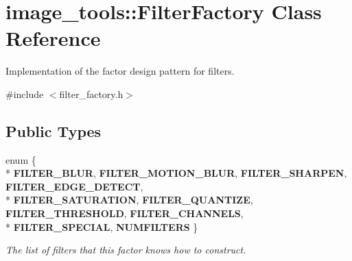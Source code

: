\hypertarget{classimage__tools_1_1FilterFactory}{}\section{image\+\_\+tools\+:\+:Filter\+Factory Class Reference}
\label{classimage__tools_1_1FilterFactory}


Implementation of the factor design pattern for filters.  




{\ttfamily \#include $<$filter\+\_\+factory.\+h$>$}

\subsection*{Public Types}
\begin{DoxyCompactItemize}
\item 
enum \{ \\*
{\bfseries F\+I\+L\+T\+E\+R\+\_\+\+B\+L\+UR}, 
{\bfseries F\+I\+L\+T\+E\+R\+\_\+\+M\+O\+T\+I\+O\+N\+\_\+\+B\+L\+UR}, 
{\bfseries F\+I\+L\+T\+E\+R\+\_\+\+S\+H\+A\+R\+P\+EN}, 
{\bfseries F\+I\+L\+T\+E\+R\+\_\+\+E\+D\+G\+E\+\_\+\+D\+E\+T\+E\+CT}, 
\\*
{\bfseries F\+I\+L\+T\+E\+R\+\_\+\+S\+A\+T\+U\+R\+A\+T\+I\+ON}, 
{\bfseries F\+I\+L\+T\+E\+R\+\_\+\+Q\+U\+A\+N\+T\+I\+ZE}, 
{\bfseries F\+I\+L\+T\+E\+R\+\_\+\+T\+H\+R\+E\+S\+H\+O\+LD}, 
{\bfseries F\+I\+L\+T\+E\+R\+\_\+\+C\+H\+A\+N\+N\+E\+LS}, 
\\*
{\bfseries F\+I\+L\+T\+E\+R\+\_\+\+S\+P\+E\+C\+I\+AL}, 
{\bfseries N\+U\+M\+F\+I\+L\+T\+E\+RS}
 \}\hypertarget{classimage__tools_1_1FilterFactory_a9c6f4b60477b44abe530d05111510fa4}{}\label{classimage__tools_1_1FilterFactory_a9c6f4b60477b44abe530d05111510fa4}
\begin{DoxyCompactList}\small\item\em The list of filters that this factor knows how to construct. \end{DoxyCompactList}
\end{DoxyCompactItemize}
